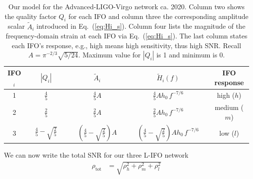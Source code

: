 \documentclass[prd,amsmath,amssymb,aps,floats,amsfonts,notitlepage,superscriptaddress,eqsecnum,nofootinbib,10pt]{revtex4-1}
\newcommand{\nn}{\nonumber}
\newcommand{\f}{\frac}
\newcommand\T{\rule{0pt}{2.6ex}}       %
\newcommand\B{\rule[-1.2ex]{0pt}{0pt}} %
\begin{document}
\begin{table}[h]
\centering
\begin{tabular}{ccccc}
\hline\hline
 IFO$_i$  %
 & $|Q_i|$ & $\tilde{A}_i$ & $\tilde{H}_i(f)$ & IFO response\T\B \\
 \hline
 1 &  $\tfrac{4}{5} $&  $\tfrac{4}{5}A$ & $\tfrac{4}{5}A h_0\, f^{-7/6}$ & high ($h$) \T\\
 2 &  $\tfrac{2}{5} $ & $\tfrac{2}{5}A$ & $ \tfrac{2}{5}A h_0 \, f^{-7/6}$ & medium ($m$)\B\T \\
 3 &  $\quad \tfrac{4}{5}-\sqrt{\tfrac{2}{5}} \quad $
 & $\quad\left(\tfrac{4}{5}-\sqrt{\tfrac{2}{5}}\right)A \quad$ & $\quad \left(\tfrac{4}{5}-\sqrt{\tfrac{2}{5}}\right)A h_0 \, f^{-7/6}\quad$& low ($l$) \B \\
 \hline\hline
\end{tabular}
\caption{%
Our model for the Advanced-LIGO-Virgo network ca. 2020. %
Column two shows the quality factor $Q_i$ for each IFO and column three the corresponding amplitude scalar $\tilde{A}_i$ introduced
in Eq.~(\ref{eq:Hi_s}).
Column four lists the magnitude of the frequency-domain strain at each IFO via Eq.~(\ref{eq:Hi_s}).
The last column states each IFO's response, e.g., high means high sensitivity, thus high SNR.
Recall $A= \pi^{-2/3} \sqrt{5/24}$. Maximum value for $|Q_i|$ is 1 and minimum is 0.
}\label{table:network_params}
\end{table}
%
%
We can now write the total SNR for our three L-IFO network
%
\begin{align}
\rho_\text{tot} &= \sqrt{\rho^2_h+\rho^2_m+\rho^2_l} \label{eq:SNR_total_3IFOs} 
\end{align}
%
\end{document}
